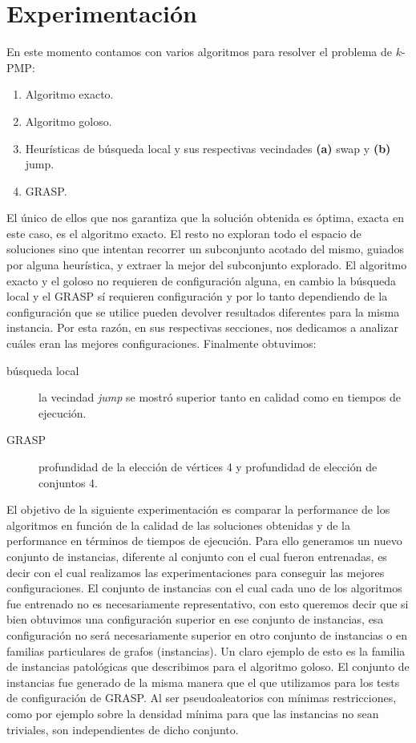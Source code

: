 \section{Experimentación} 

\noindent En este momento contamos con varios algoritmos para resolver el problema de $k$-PMP:
\begin{enumerate}
  \item Algoritmo exacto.
  \item Algoritmo goloso.
  \item Heurísticas de búsqueda local y sus respectivas vecindades \textbf{(a)} swap y \textbf{(b)} jump.
  \item GRASP.
\end{enumerate}

El único de ellos que nos garantiza que la solución obtenida es óptima, exacta en este caso, es el algoritmo exacto.
El resto no exploran todo el espacio de soluciones sino que intentan recorrer un subconjunto acotado del mismo,
guiados por alguna heurística, y extraer la mejor del subconjunto explorado. El algoritmo exacto y el goloso
no requieren de configuración alguna, en cambio la búsqueda local y el GRASP sí requieren configuración y por lo tanto
dependiendo de la configuración que se utilice pueden devolver resultados diferentes para la misma instancia.
Por esta razón, en sus respectivas secciones, nos dedicamos a analizar cuáles eran las mejores configuraciones.
Finalmente obtuvimos:

\begin{description}
  \item[búsqueda local] la vecindad \textit{jump} se mostró superior tanto en calidad como en tiempos de ejecución.
  \item[GRASP] profundidad de la elección de vértices 4 y profundidad de elección de conjuntos 4. 
\end{description}

El objetivo de la siguiente experimentación es comparar la performance de los algoritmos en función de la calidad de las soluciones obtenidas y de la performance en términos de tiempos de ejecución. Para ello
generamos un nuevo conjunto de instancias, diferente al conjunto con el cual fueron entrenadas, es decir
con el cual realizamos las experimentaciones para conseguir las mejores configuraciones. El conjunto de
instancias con el cual cada uno de los algoritmos fue entrenado no es necesariamente representativo, con
esto queremos decir que si bien obtuvimos una configuración superior en ese conjunto de instancias, esa
configuración no será necesariamente superior en otro conjunto de instancias o en 
familias particulares de grafos (instancias). Un claro ejemplo de esto es la familia de instancias
patológicas que describimos para el algoritmo goloso.
El conjunto de instancias fue generado de la misma manera que el que utilizamos para los tests de configuración
de GRASP. Al ser pseudoaleatorios con mínimas restricciones, como por ejemplo sobre la densidad mínima para que
las instancias no sean triviales, son independientes de dicho conjunto.

